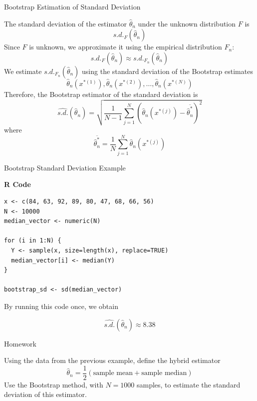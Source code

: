\documentclass[8pt]{beamer}
\begin{document}
\begin{frame}{Bootstrap Estimation of Standard Deviation}

The standard deviation of the estimator $\widehat{\theta}_n$ under the unknown distribution $F$ is
\[
s.d._F(\widehat{\theta}_n)
\]
Since $F$ is unknown, we approximate it using the empirical distribution $F_n$:
\[
s.d._F(\widehat{\theta}_n)
\approx
s.d._{F_n}(\widehat{\theta}_n)
\]
We estimate $s.d._{F_n}(\widehat{\theta}_n)$ using the standard deviation of the Bootstrap estimates
\[
\widehat{\theta}_n(x^{*(1)}),
\widehat{\theta}_n(x^{*(2)}),
\ldots,
\widehat{\theta}_n(x^{*(N)})
\]
Therefore, the Bootstrap estimator of the standard deviation is
\[
\widehat{s.d.}(\widehat{\theta}_n)=\sqrt{\frac{1}{N-1}\sum_{j=1}^N\left(\widehat{\theta}_n(x^{*(j)})-\overline{\widehat{\theta}_n^*}\right)^2}
\]
where
\[
\overline{\widehat{\theta}_n^*}=\frac{1}{N} \sum_{j=1}^N \widehat{\theta}_n(x^{*(j)})
\]

\end{frame}

\begin{frame}[fragile]{Bootstrap Standard Deviation Example}

\textbf{R Code}

\begin{lstlisting}
x <- c(84, 63, 92, 89, 80, 47, 68, 66, 56)
N <- 10000
median_vector <- numeric(N)

for (i in 1:N) {
  Y <- sample(x, size=length(x), replace=TRUE) 
  median_vector[i] <- median(Y)
}

bootstrap_sd <- sd(median_vector)
\end{lstlisting}

By running this code once, we obtain

\[
\widehat{s.d.}(\widehat{\theta}_n) \approx 8.38
\]

\end{frame}

\begin{frame}{Homework}

Using the data from the previous example, define the hybrid estimator
\[
\widehat{\theta}_n=\frac{1}{2}(\text{sample mean} + \text{sample median})
\]
Use the Bootstrap method, with $N=1000$ samples, to estimate the standard deviation of this estimator.
\end{frame}
\end{document}
